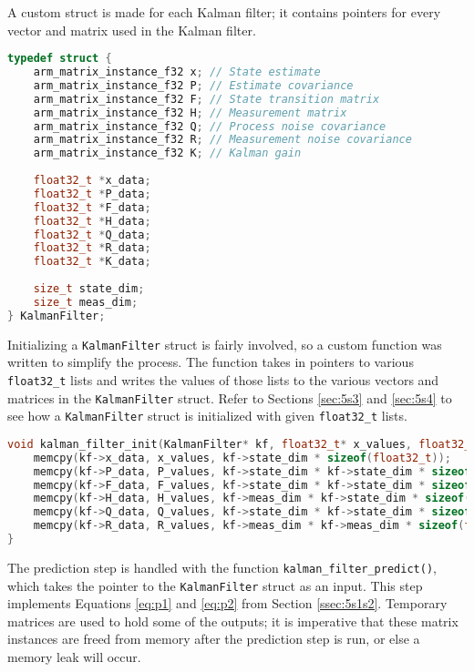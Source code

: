 \documentclass[12pt,a4paper]{report}
\begin{document}
A custom struct is made for each Kalman filter; it contains pointers for every vector and matrix used in the Kalman filter.

\begin{lstlisting}[language=C++]
typedef struct {
	arm_matrix_instance_f32 x; // State estimate
	arm_matrix_instance_f32 P; // Estimate covariance
	arm_matrix_instance_f32 F; // State transition matrix
	arm_matrix_instance_f32 H; // Measurement matrix
	arm_matrix_instance_f32 Q; // Process noise covariance
	arm_matrix_instance_f32 R; // Measurement noise covariance
	arm_matrix_instance_f32 K; // Kalman gain
	
	float32_t *x_data;
	float32_t *P_data;
	float32_t *F_data;
	float32_t *H_data;
	float32_t *Q_data;
	float32_t *R_data;
	float32_t *K_data;
	
	size_t state_dim;
	size_t meas_dim;
} KalmanFilter;
\end{lstlisting}

Initializing a \verb|KalmanFilter| struct is fairly involved, so a custom function was written to simplify the process. The function takes in pointers to various \verb|float32_t| lists and writes the values of those lists to the various vectors and matrices in the \verb|KalmanFilter| struct. Refer to Sections \ref{sec:5s3} and \ref{sec:5s4} to see how a \verb|KalmanFilter| struct is initialized with given \verb|float32_t| lists.

\pagebreak

\begin{lstlisting}[language=C++]
void kalman_filter_init(KalmanFilter* kf, float32_t* x_values, float32_t* P_values, float32_t* F_values, float32_t* H_values, float32_t* Q_values, float32_t* R_values) {
	memcpy(kf->x_data, x_values, kf->state_dim * sizeof(float32_t));
	memcpy(kf->P_data, P_values, kf->state_dim * kf->state_dim * sizeof(float32_t));
	memcpy(kf->F_data, F_values, kf->state_dim * kf->state_dim * sizeof(float32_t));
	memcpy(kf->H_data, H_values, kf->meas_dim * kf->state_dim * sizeof(float32_t));
	memcpy(kf->Q_data, Q_values, kf->state_dim * kf->state_dim * sizeof(float32_t));
	memcpy(kf->R_data, R_values, kf->meas_dim * kf->meas_dim * sizeof(float32_t));
}
\end{lstlisting}

The prediction step is handled with the function \verb|kalman_filter_predict()|, which takes the pointer to the \verb|KalmanFilter| struct as an input. This step implements Equations \ref{eq:p1} and \ref{eq:p2} from Section \ref{ssec:5s1s2}. Temporary matrices are used to hold some of the outputs; it is imperative that these matrix instances are freed from memory after the prediction step is run, or else a memory leak will occur.
\end{document}

